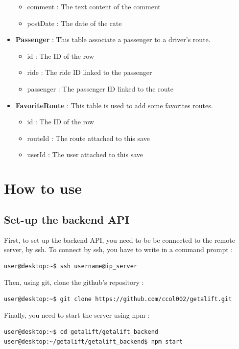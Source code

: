 \begin{itemize}
\begin{itemize}
    	\item comment : The text content of the comment
    	\item postDate : The date of the rate
    \end{itemize}
    \item \textbf{Passenger} : This table associate a passenger to a driver's route.
    \begin{itemize}
    	\item id : The ID of the row
    	\item ride : The ride ID linked to the passenger
    	\item passenger : The passenger ID linked to the route
    \end{itemize}
    \item \textbf{FavoriteRoute} : This table is used to add some favorites routes.
	\begin{itemize}
    	\item id : The ID of the row
    	\item routeId : The route attached to this save
    	\item userId : The user attached to this save
    \end{itemize}
\end{itemize}

\section{How to use}

\subsection{Set-up the backend API}
First, to set up the backend API, you need to be be connected to the remote server, by ssh. To connect by ssh, you have to write in a command prompt :

\begin{lstlisting}[style=DOS]
user@desktop:~$ ssh username@ip_server
\end{lstlisting}

Then, using git, clone the github's repository :
\begin{lstlisting}[style=DOS]
user@desktop:~$ git clone https://github.com/ccol002/getalift.git
\end{lstlisting}

Finally, you need to start the server using npm :
\begin{lstlisting}[style=DOS]
user@desktop:~$ cd getalift/getalift_backend
user@desktop:~/getalift/getalift_backend$ npm start
\end{lstlisting}

